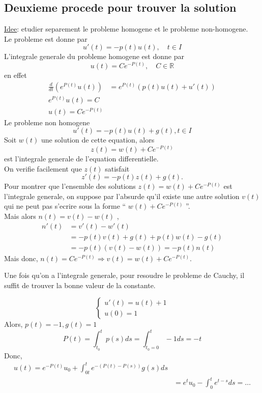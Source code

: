 \documentclass[../main.tex]{subfiles}
\begin{document}
\subsection{Deuxieme procede pour trouver la solution}
\underline{Idee}: etudier separement le probleme homogene et le probleme non-homogene.\\
Le probleme est donne par
\[ 
	u'( t) = - p( t) u( t) , \quad t \in I
\]
L'integrale generale du probleme homogene est donne par
\[ 
	u( t) = Ce^{-P( t) } , \quad C \in \mathbb{R}
\]
en effet
\begin{align*}
	\frac{d}{dt}\left( e^{P( t) } u( t) \right) &= e^{P( t) } \left( p( t) u( t) + u'( t) \right) \\
	e^{P( t) } u( t) = C\\
	u( t) = C e^{- P( t) } 
\end{align*}
Le probleme non homogene 
\[ 
	u'( t) = - p( t) u( t) + g( t) , t \in I
\]
Soit $w( t) $ une solution de cette equation, alors
\[ 
	z( t) = w( t) + C e^{- P( t) } 
\]
est l'integrale generale de l'equation differentielle.\\
On verifie facilement que $z( t) $ satisfait
\[ 
	z'( t) = - p( t) z( t) + g( t) .
\]
Pour montrer que l'ensemble des solutions $z( t) = w( t) + C e^{- P( t) } $ est l'integrale generale, on suppose par l'absurde qu'il existe une autre solution $v( t) $ qui ne peut pas s'ecrire sous la forme `` $w( t) + C e^{- P( t) } $ ''.\\
Mais alors $n( t) = v( t) - w( t) $ ,
\begin{align*}
	n'( t) &= v'( t) - w'( t) \\
	       &= - p( t) v( t) + g( t)  + p( t) w( t)  - g( t) \\
	       &= - p( t)  ( v( t) - w( t) ) = - p( t) n( t) 
\end{align*}
Mais donc, $n( t) = C e^{- P( t) } \Rightarrow v( t) = w( t) + C e^{- P( t) } .$ 
\begin{rmq}
Une fois qu'on a l'integrale generale, pour resoudre le probleme de Cauchy, il suffit de trouver la bonne valeur de la constante.
\end{rmq}
\begin{exemple}
\[ 
\begin{cases}
	u'( t) = u( t) + 1\\
	u( 0) = 1
\end{cases}
\]
Alors, $p( t) = -1, g( t) =1$ 
\[ 
	P( t) = \int_{ t_0 }^{ t }p( s) ds = \int_{ t_0 =0}^{ t } -1 ds =  -t
\]
Donc, 
\begin{align*}
u( t) = e^{-P( t) } u_0 + \int_{ 0t }^{ t } e^{- ( P( t) - P( s) ) } g( s) ds\\
&= e^{t } u_0 - \int_{ 0 }^{ t } e^{t-s} ds = \ldots
\end{align*}
\end{exemple}
\end{document}
